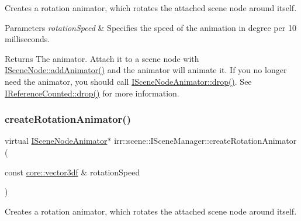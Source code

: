 Creates a rotation animator, which rotates the attached scene node around itself. 


\begin{DoxyParams}{Parameters}
{\em rotation\+Speed} & Specifies the speed of the animation in degree per 10 milliseconds. \\
\hline
\end{DoxyParams}
\begin{DoxyReturn}{Returns}
The animator. Attach it to a scene node with \hyperlink{classirr_1_1scene_1_1ISceneNode_a0e5cd342cd7293c136e53e2c2c5e0f3a}{I\+Scene\+Node\+::add\+Animator()} and the animator will animate it. If you no longer need the animator, you should call \hyperlink{classirr_1_1IReferenceCounted_a03856a09355b89d178090c4a5f738543}{I\+Scene\+Node\+Animator\+::drop()}. See \hyperlink{classirr_1_1IReferenceCounted_a03856a09355b89d178090c4a5f738543}{I\+Reference\+Counted\+::drop()} for more information. 
\end{DoxyReturn}
\mbox{\label{classirr_1_1scene_1_1ISceneManager_a29efe9505de4e5dc2218283ef0c2a64d}} 
\subsubsection{\texorpdfstring{create\+Rotation\+Animator()}{createRotationAnimator()}\hspace{0.1cm}{\footnotesize\ttfamily [2/2]}}
{\footnotesize\ttfamily virtual \hyperlink{classirr_1_1scene_1_1ISceneNodeAnimator}{I\+Scene\+Node\+Animator}$\ast$ irr\+::scene\+::\+I\+Scene\+Manager\+::create\+Rotation\+Animator (\begin{DoxyParamCaption}\item[{const \hyperlink{namespaceirr_1_1core_ae6e2b2a6c552833ebbd5b7463d03586b}{core\+::vector3df} \&}]{rotation\+Speed }\end{DoxyParamCaption})\hspace{0.3cm}{\ttfamily [pure virtual]}}



Creates a rotation animator, which rotates the attached scene node around itself. 


